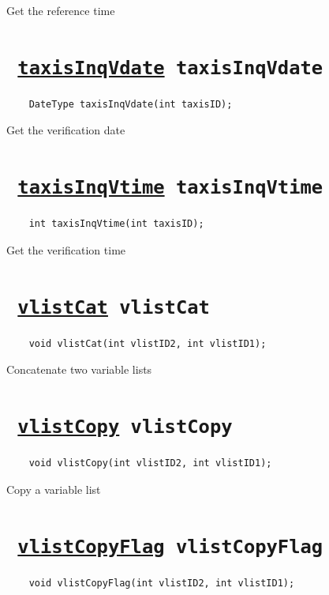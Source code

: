 Get the reference time
\ifpdfoutput{}{(\ref{taxisInqRtime})}


\section*{\texttt{ 
\ifpdf
\hyperref[taxisInqVdate]{taxisInqVdate}
\else
taxisInqVdate
\fi
}}
\begin{verbatim}
    DateType taxisInqVdate(int taxisID);
\end{verbatim}

Get the verification date
\ifpdfoutput{}{(\ref{taxisInqVdate})}


\section*{\texttt{ 
\ifpdf
\hyperref[taxisInqVtime]{taxisInqVtime}
\else
taxisInqVtime
\fi
}}
\begin{verbatim}
    int taxisInqVtime(int taxisID);
\end{verbatim}

Get the verification time
\ifpdfoutput{}{(\ref{taxisInqVtime})}


\section*{\texttt{ 
\ifpdf
\hyperref[vlistCat]{vlistCat}
\else
vlistCat
\fi
}}
\begin{verbatim}
    void vlistCat(int vlistID2, int vlistID1);
\end{verbatim}

Concatenate two variable lists
\ifpdfoutput{}{(\ref{vlistCat})}


\section*{\texttt{ 
\ifpdf
\hyperref[vlistCopy]{vlistCopy}
\else
vlistCopy
\fi
}}
\begin{verbatim}
    void vlistCopy(int vlistID2, int vlistID1);
\end{verbatim}

Copy a variable list
\ifpdfoutput{}{(\ref{vlistCopy})}


\section*{\texttt{ 
\ifpdf
\hyperref[vlistCopyFlag]{vlistCopyFlag}
\else
vlistCopyFlag
\fi
}}
\begin{verbatim}
    void vlistCopyFlag(int vlistID2, int vlistID1);
\end{verbatim}

